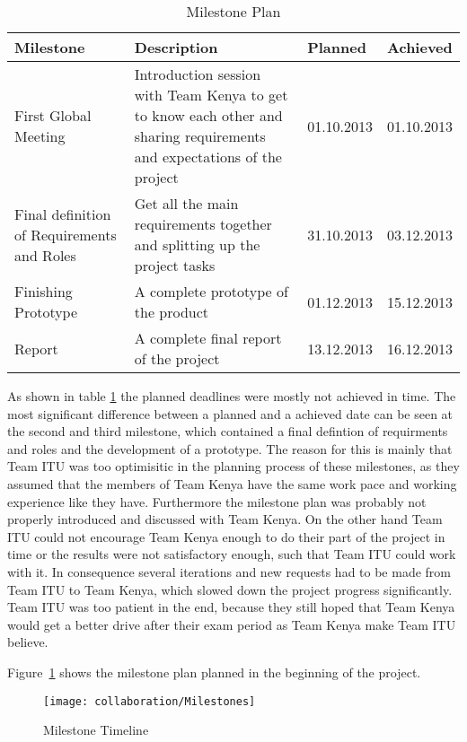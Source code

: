 \begin{table}[tb]
	\centering
	\begin{tabular}{ |  p{4cm} |  p{6cm} | l | l |}
    		\hline
   		Milestone & Description & Planned & Achieved \\ \hline
    		First Global Meeting & Introduction session with Team Kenya to get to know each other and sharing requirements and expectations of the project & 01.10.2013 & 01.10.2013 \\ \hline
    		Final definition of Requirements and Roles & Get all the main requirements together and splitting up the project tasks & 31.10.2013 & 03.12.2013 \\ \hline
    		Finishing Prototype & A complete prototype of the product & 01.12.2013 & 15.12.2013\\ \hline
		Report & A complete final report of the project & 13.12.2013 & 16.12.2013\\ \hline
	\end{tabular}
	\caption{Milestone Plan}
	\label{tab:milestones_table}
\end{table}

As shown in table \ref{tab:milestones_table} the planned deadlines were mostly not achieved in time. The most significant difference between a planned and a achieved date can be seen at the second and third milestone, which contained a final defintion of requirments and roles and the development of a prototype. The reason for this is mainly that Team ITU was too optimisitic in the planning process of these milestones, as they assumed that the members of Team Kenya have the same work pace and working experience like they have. Furthermore the milestone plan was probably not properly introduced and discussed with Team Kenya. On the other hand Team ITU could not encourage Team Kenya enough to do their part of the project in time or the results were not satisfactory enough, such that Team ITU could work with it. In consequence several iterations and new requests had to be made from Team ITU to Team Kenya, which slowed down the project progress significantly. Team ITU was too patient in the end, because they still hoped that Team Kenya would get a better drive after their exam period as Team Kenya make Team ITU believe.

Figure~\ref{fig:milestones} shows the milestone plan planned in the beginning of the project.

	\begin{figure}[tb]
		\centering
		\texttt{[image: collaboration/Milestones]}
		\caption{Milestone Timeline}
		\label{fig:milestones}
	\end{figure}

